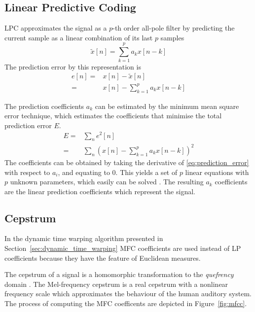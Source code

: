 \subsection{Linear Predictive Coding} %
\label{sub:lpc}
LPC approximates the signal as a $p$-th order all-pole filter by predicting the current sample as a linear combination of its last $p$ samples \cite{digsig}
\begin{equation}
	\tilde{x}[n] = \sum_{k=1}^{p}a_k x[n-k]
\end{equation}
The prediction error by this representation is 
\begin{equation}
	\begin{split}
		e[n]= & x[n]-\tilde{x}[n]\\
		= & x[n]-\sum_{k=1}^{p}a_k x[n-k]
	\end{split}
\end{equation}

The prediction coefficients $a_k$ can be estimated by the minimum mean square error technique, which estimates the coefficients that minimise the total prediction error $E$.
\begin{equation}
	\label{eq:prediction_error}
	\begin{split}
		E = & \sum_{n}e^2[n]\\
		= & \sum_{n}\left( x[n]-\sum_{k=1}^{p}a_k x[n-k] \right)^2
	\end{split}
\end{equation}
The coefficients can be obtained by taking the derivative of \eqref{eq:prediction_error} with respect to $a_i$, and equating to 0. This yields a set of $p$ linear equations with $p$ unknown parameters, which easily can be solved \cite{digsig}. The resulting $a_k$ coefficients are the linear prediction coefficients which represent the signal.

\subsection{Cepstrum} %
\label{sub:mel_frequency_cepstrum}
In the dynamic time warping algorithm presented in Section~\ref{sec:dynamic_time_warping} MFC coefficients are used instead of LP coefficients because they have the feature of Euclidean measures.

The cepstrum of a signal is a homomorphic transformation to the \emph{quefrency} domain \cite{taletek}. The Mel-frequency cepstrum is a real cepstrum with a nonlinear frequency scale which approximates the behaviour of the human auditory system. The process of computing the MFC coefficents are depicted in Figure~\ref{fig:mfcc}.

